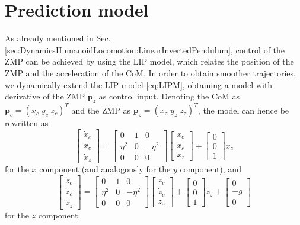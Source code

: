 \section{Prediction model}
As already mentioned in Sec. \ref{sec:DynamicsHumanoidLocomotion:LinearInvertedPendulum},
control of the ZMP can be achieved by using the LIP model, which relates the 
position of the ZMP and the acceleration of the CoM. In order to obtain smoother
trajectories, we dynamically extend the LIP model \eqref{eq:LIPM}, obtaining a
model with derivative of the ZMP $\dot{\bm{p}}_z$ as control input. Denoting
the CoM as $\bm{p}_c = (x_c \; y_c \; z_c)^T$ and the ZMP as $\bm{p}_z = (x_z \; y_z \; z_z)^T$, the 
model can hence be rewritten as
\begin{equation*}
    \label{eq:LIPM-x-dynamic-extension}
    \begin{bmatrix}
        \dot{x}_c \\ \ddot{x}_c \\ \dot{x}_z 
    \end{bmatrix}
    =
    \begin{bmatrix}
        0 & 1 & 0 \\ 
        \eta^2 & 0 & -\eta^2 \\
        0 & 0 & 0
    \end{bmatrix}
    \begin{bmatrix}
        x_c \\ \dot{x}_c \\ x_z 
    \end{bmatrix}
    +
    \begin{bmatrix}
        0 \\ 0 \\ 1
    \end{bmatrix}
    \dot{x}_z
\end{equation*}
for the $x$ component (and analogously for the $y$ component), and
\begin{equation*}
    \begin{bmatrix}
        \dot{z}_c \\ \ddot{z}_c \\ \dot{z}_z 
    \end{bmatrix}
    =
    \begin{bmatrix}
        0 & 1 & 0 \\ 
        \eta^2 & 0 & -\eta^2 \\
        0 & 0 & 0
    \end{bmatrix}
    \begin{bmatrix}
        z_c \\ \dot{z}_c \\ z_z 
    \end{bmatrix}
    +
    \begin{bmatrix}
        0 \\ 0 \\ 1
    \end{bmatrix}
    \dot{z}_z
    +
    \begin{bmatrix}
        0 \\ -g \\ 0
    \end{bmatrix}
\end{equation*}
for the $z$ component.

